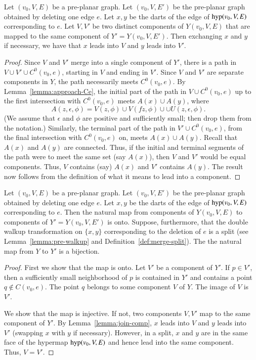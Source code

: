 \begin{lemma}\label{lemma:join-comp}
Let $(v_0,V,E)$ be a pre-planar graph.  Let $(v_0,V,E')$
be the pre-planar graph obtained by deleting one edge $e$.
Let $x,y$ be the darts of the edge of
${\operatorname{hyp}}(v_0,V,E)$ corresponding
to $e$.
Let $V,V'$ be two distinct
components of $Y(v_0,V,E)$ that are mapped
to the same component of $Y'=Y(v_0,V,E')$.  Then exchanging
$x$ and $y$ if necessary, we have that $x$ leads into $V$
and $y$ leads into $V'$.
\end{lemma}

\begin{proof}
Since $V$ and $V'$ merge into a single component of $Y'$,
there is a path in $V\cup V'\cup C^0(v_0,e)$, starting in $V$
and ending in $V'$.  Since $V$ and $V'$ are separate components
in $Y$, the path necessarily meets $C^0(v_0,e)$.
By Lemma~\ref{lemma:approach-Ce}, the
initial part of the path in $V\cup C^0(v_0,e)$ up to the first
intersection with $C^0(v_0,e)$ meets $A(x)\cup A(y)$, where
  $$
  A(z,\epsilon,\phi) = 
    V(z,\phi) \cup V(f z,\phi)\cup 
  \cup U(z,\epsilon,\phi).
  $$
(We assume that $\epsilon$ and $\phi$ are positive and sufficiently
small; then drop them from the notation.)
Similarly, the terminal part of the path in $V'\cup C^0(v_0,e)$, 
from the
final intersection with $C^0(v_0,e)$ on, meets $A(x)\cup A(y)$.
Recall that $A(x)$ and $A(y)$ are connected.  Thus,
if the initial and terminal segments of the path were to
meet the
same set (say $A(x)$), then $V$ and $V'$ would be equal components.
Thus, $V$ contains (say) $A(x)$ and $V'$ contains $A(y)$.
The result now follows from the definition of what it means
to lead into a component.
\end{proof}


\begin{lemma}
Let $(v_0,V,E)$ be a pre-planar graph.  Let $(v_0,V,E')$
be the pre-planar graph obtained by deleting one edge $e$.
Let $x,y$ be the darts of the edge of
${\operatorname{hyp}}(v_0,V,E)$ corresponding
to $e$.  Then
the natural map from components of $Y(v_0,V,E)$ to components
of $Y'=Y(v_0,V,E')$ is onto.
Suppose, furthermore, that the double walkup transformation
on $\{x,y\}$ corresponding to the deletion of $e$ is a split
(see Lemma~\ref{lemma:pre-walkup} 
and Definition~\ref{def:merge-split}).  
The the natural map from $Y$ to $Y'$ is a bijection.
\end{lemma}

\begin{proof}
First we show that the map is onto.  Let $V'$
be a component of $Y'$.  If $p\in V'$,
then a sufficiently small neighborhood of $p$ is contained
in $Y'$ and contains a point $q\not\in C(v_0,e)$.  The
point $q$ belongs to some component $V$ of $Y$.  The image
of $V$ is $V'$.

We show that the map is injective.  If not, two
components $V,V'$ map to the same component of $Y'$.
By Lemma~\ref{lemma:join-comp}, $x$ leads into $V$ and
$y$ leads into $V'$ (swapping $x$ with $y$ if necessary).
However, in a split, $x$ and $y$ are in the same face of
the hypermap ${\operatorname{hyp}}(v_0,V,E)$ and hence lead into the
same component.  Thus, $V=V'$.
\end{proof}

